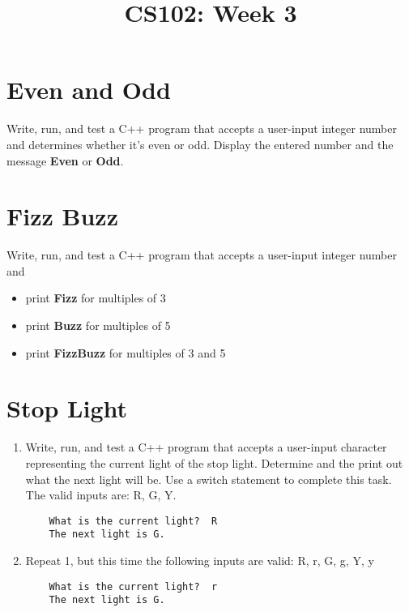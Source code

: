 \documentclass{article}
\begin{document}
\title{CS102: Week 3}

\maketitle

\section*{Even and Odd}
Write, run, and test a C++ program that accepts a user-input integer number and determines whether it’s even or odd. Display the entered number and the message \textbf{Even} or \textbf{Odd}.

\section*{Fizz Buzz}
Write, run, and test a C++ program that accepts a user-input integer number and  
\begin{itemize}
	\item print \textbf{Fizz} for multiples of 3
	\item print \textbf{Buzz} for multiples of 5
	\item print \textbf{FizzBuzz} for multiples of 3 and 5
\end{itemize}

\section*{Stop Light}
\begin{enumerate}
\item Write, run, and test a C++ program that accepts a user-input character representing the current light of the stop light. Determine and the print out what the next light will be. Use a switch statement to complete this task. The valid inputs are: R, G, Y.
\begin{verbatim}
	What is the current light?  R
	The next light is G.
\end{verbatim}
\item Repeat 1, but this time the following inputs are valid: R, r, G, g, Y, y
\begin{verbatim}
	What is the current light?  r
	The next light is G.
\end{verbatim}
\end{enumerate}
\end{document}
